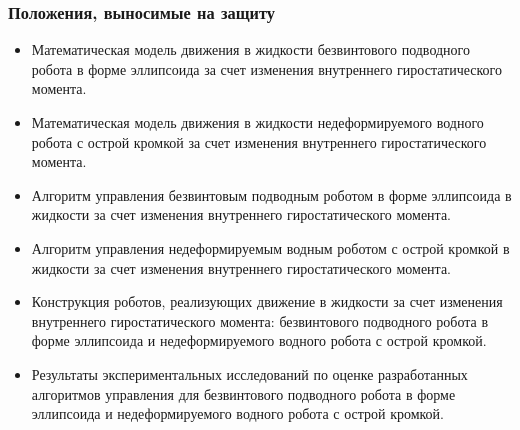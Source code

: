\begin{frame}
    \frametitle{Положения, выносимые на защиту}
\small    
    \begin{itemize}
        \item Математическая модель движения в жидкости безвинтового подводного робота в форме эллипсоида за счет изменения внутреннего гиростатического момента.
        \item Математическая модель движения в жидкости недеформируемого водного робота с острой кромкой за счет изменения внутреннего гиростатического момента. %
        \item Алгоритм управления безвинтовым подводным роботом в форме эллипсоида в жидкости за счет изменения внутреннего гиростатического момента.
        \item Алгоритм управления недеформируемым водным роботом с острой кромкой в жидкости за счет изменения внутреннего гиростатического момента.
        \item Конструкция роботов, реализующих движение в жидкости за счет изменения внутреннего гиростатического момента:  безвинтового подводного робота в форме эллипсоида и недеформируемого водного робота с острой кромкой.
        \item Результаты экспериментальных исследований по оценке разработанных алгоритмов управления для безвинтового подводного робота в форме эллипсоида и недеформируемого водного робота с острой кромкой.        
    \end{itemize}
\end{frame}
%
%
%
%
%
